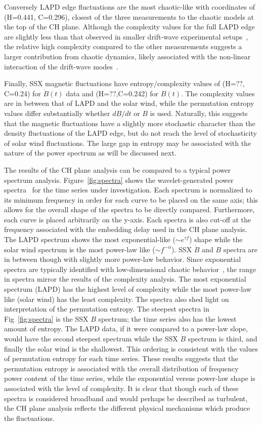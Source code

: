 \documentclass[aps,pre,twocolumn,secnumarabic,nobalancelastpage,amsmath,amssymb,
nofootinbib]{revtex4-1}
\begin{document}
Conversely LAPD edge fluctuations are the most chaotic-like with coordinates of (H=0.441, C=0.296), closest of the three measurements to the chaotic models at the top of the CH plane. Although the complexity values for the full LAPD edge are slightly less than that observed in smaller drift-wave experimental setups~\cite{maggs2013}, the relative high complexity compared to the other measurements suggests a larger contribution from chaotic dynamics, likely associated with the non-linear interaction of the drift-wave modes~\cite{maggs2012}. 

Finally, SSX magnetic fluctuations have entropy/complexity values of (H=??, C=0.24) for $\dot{B}(t)$ data and (H=??,C=0.242) for $B(t)$. The complexity values are in between that of LAPD and the solar wind, while the permutation entropy values differ substantially whether $dB/dt$ or $B$ is used. Naturally, this suggests that the magnetic fluctuations have a slightly more stochastic character than the density fluctuations of the LAPD edge, but do not reach the level of stochasticity of solar wind fluctuations. The large gap in entropy may be associated with the nature of the power spectrum as will be discussed next.

The results of the CH plane analysis can be compared to a typical power spectrum analysis. Figure~\ref{fig:spectra} shows the wavelet-generated power spectra~\cite{torrence1998} for the time series under investigation. Each spectrum is normalized to its minimum frequency in order for each curve to be placed on the same axis; this allows for the overall shape of the spectra to be directly compared. Furthermore, each curve is placed arbitrarily on the y-axis. Each spectra is also cut-off at the frequency associated with the embedding delay used in the CH plane analysis. The LAPD spectrum shows the most exponential-like ($\sim e^{\tau f}$) shape while the solar wind spectrum is the most power-law like ($\sim f^{-\alpha}$). SSX $\dot{B}$ and $B$ spectra are in between though with slightly more power-law behavior. Since exponential spectra are typically identified with low-dimensional chaotic behavior~\cite{maggs2012}, the range in spectra mirror the results of the complexity analysis. The most exponential spectrum (LAPD) has the highest level of complexity while the most power-law like (solar wind) has the least complexity. The spectra also shed light on interpretation of the permutation entropy. The steepest spectra in Fig~\ref{fig:spectra} is the SSX $B$ spectrum; the time series also has the lowest amount of entropy. The LAPD data, if it were compared to a power-law slope, would have the second steepest spectrum while the SSX $\dot{B}$ spectrum is third, and finally the solar wind is the shallowest. This ordering is consistent with the values of permutation entropy for each time series. These results suggests that the permutation entropy is associated with the overall distribution of frequency power content of the time series, while the exponential versus power-law shape is associated with the level of complexity. It is clear that though each of these spectra is considered broadband and would perhaps be described as turbulent, the CH plane analysis reflects the different physical mechanisms which produce the fluctuations.
\end{document}
